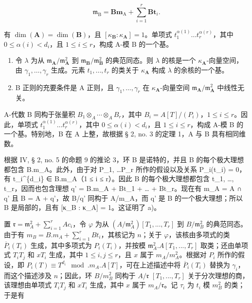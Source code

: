 \[
\mathfrak {m} _ {\mathrm{B}} = \mathbf {B m} _ {\mathrm{A}} + \sum_ {i = 1} ^ {r} \mathbf {B t} _ {i}.
\]

有 \(\dim(\mathbf{A}) = \dim(\mathbf{B})\)，且 \([\kappa_{\mathbf{B}}: \kappa_{\mathbf{A}}] = 1\)。单项式 \(t_1^{\alpha(1)} \ldots t_r^{\alpha(r)}\)，其中 \(0 \leqslant \alpha(i) < d_i\)，且 \(1 \leqslant i \leqslant r\)，构成 A-模 B 的一个基。

\begin{enumerate}
\def\labelenumi{\alph{enumi})}
\setcounter{enumi}{1}
\item
  令 \(\lambda\) 为从 \(\mathfrak{m}_{\mathbf{A}} / \mathfrak{m}_{\mathbf{A}}^{2}\) 到 \(\mathfrak{m}_{\mathbf{B}} / \mathfrak{m}_{\mathbf{B}}^{2}\) 的典范同态。则 \(\lambda\) 的核是一个 \(\kappa_{\mathbf{A}}\)-向量空间，由 \(\gamma_{1}, \ldots, \gamma_{r}\) 生成。元素 \(t_{1}, \ldots, t_{r}\) 的类关于 \(\kappa_{\mathbf{A}}\) 构成 \(\lambda\) 的余核的一个基。
\item
  B 正则的充要条件是 A 正则，且 \(\gamma_{1},\ldots,\gamma_{r}\) 在 \(\kappa_{\mathbf{A}}\)-向量空间 \(\mathfrak{m}_{\mathbf{A}}/\mathfrak{m}_{\mathbf{A}}^{2}\) 中线性无关。
\end{enumerate}

A-代数 B 同构于张量积 \(B_{1} \otimes_{A} \cdots \otimes_{A} B_{r}\)，其中 \(B_{i} = A[T]/(P_{i})\)，\(1 \leqslant i \leqslant r\)。因此，单项式 \(t_{1}^{\alpha(1)} \ldots t_{r}^{\alpha(r)}\)，其中 \(0 \leqslant \alpha(i) < d_{i}\)，且 \(1 \leqslant i \leqslant r\)，构成 A-模 B 的一个基。特别地，B 在 A 上整，故根据 § 2, no. 3 的定理 1，A 与 B 具有相同维数。

根据 IV, § 2, no. 5 的命题 9 的推论 3，环 B 是诺特的，并且 B 的每个极大理想都包含 B.m\_A。此外，由于对 P\_1, \ldots P\_r 所作的假设以及关系 P\_i(t\_i) = 0，有 t\_i\^{}\{d\_i\} ∈ B.m\_A（1 ≤ i ≤ r）。因此 B 的每个极大理想都包含 t\_1, \ldots, t\_r，因而也包含理想 q' = B.m\_A + Bt\_1 + \ldots{} + Bt\_r。现在有 m\_A = A ∩ q' 且 B = A + q'，故 B/q' 同构于 A/m\_A，而 q' 是 B 的一个极大理想；所以 B 是局部的，且有 {[}κ\_B : κ\_A{]} = 1。这证明了 a)。

置 \(\mathfrak{r} = \mathfrak{m}_{A}^{2} + \sum_{i=1}^{r} A c_i\)，令 \(\varphi\) 为从 \((A/\mathfrak{m}_{A}^{2})[T_1, ..., T_r]\) 到 \(B/\mathfrak{m}_{B}^{2}\) 的典范同态。由于有 \(m_B = B.m_A + \sum_{i=1}^{r} B t_i\)，其核记为 \(n\)；关于 \(\varphi\)，该核由多项式的类 \(\overline{P}_i(T_i)\) 生成，其中多项式为 \(P_i(T_i)\)，并按模 \(\mathfrak{m}_{A}^{2}.A[T_1, ..., T_r]\) 取类；还由单项式 \(T_i T_j\) 和 \(x T_i\) 生成，其中 \(1 \leqslant i, j \leqslant r\)，且 \(x\) 属于 \(m_A/m_A^2\)。根据对 \(P_i\) 所作的假设，即 \(P_i(T) \equiv T^{d_i} \mod. m_A.A[T]\)，可在上述描述中将 \(\overline{P}_i(T_i)\) 替换为 \(\gamma_i\)，而这个描述涉及 \(n\)；因此，环 \(B/m_B^2\) 同构于 \(A/\mathfrak{r}\) \([T_{1}, ..., T_{r}]\) 关于分次理想的商，该理想由单项式 \(T_{i}T_{j}\) 和 \(xT_{i}\) 生成，其中 \(x\) 属于 \(m_A/\mathfrak{r}\)。记 \(\tau_{i}\) 为 \(t_{i}\) 模 \(m_{B}^{2}\) 的类；于是有

